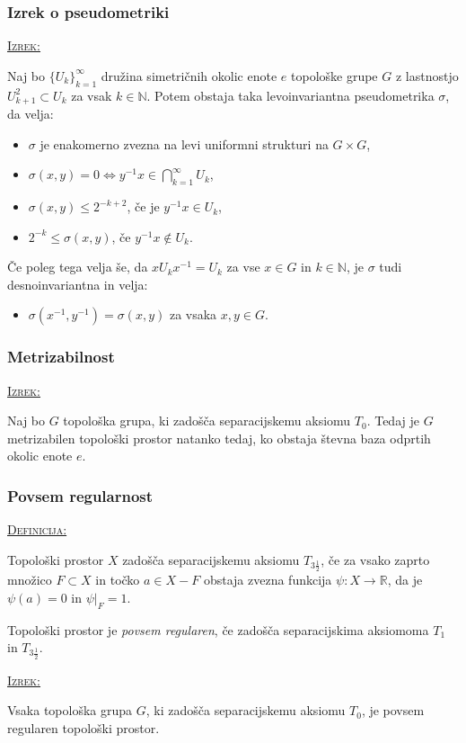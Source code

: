 \documentclass[a4paper, 12pt]{beamer}
\newenvironment{matematika}[1]{
\textcolor{bostonuniversityred}{\underline{\textsc{#1:}}}
}{
}
\begin{document}
\begin{frame}
\frametitle{Izrek o pseudometriki}
\begin{matematika}{Izrek}
	Naj bo $\{ U_k \}_{k=1}^{\infty}$ družina simetričnih okolic enote $e$ topološke grupe $G$ z lastnostjo $U_{k+1}^2 \subset U_k$ za vsak $k\in\mathbb{N}$. Potem obstaja taka levoinvariantna pseudometrika $\sigma$, da velja:
	\begin{itemize}[label=]
		\item $\sigma$ je enakomerno zvezna na levi uniformni strukturi na $G \times G$,
		\item $\sigma (x, y) = 0 \iff y^{-1}x \in \bigcap_{k=1}^{\infty}U_k$,
		\item $\sigma (x, y) \leq 2^{-k+2}$, če je $y^{-1}x \in U_k$,
		\item $2^{-k} \leq \sigma (x, y)$, če $y^{-1}x \notin U_k$.
	\end{itemize}
	Če poleg tega velja še, da $x U_k x^{-1} = U_k$ za vse $x \in G$ in $k\in\mathbb{N}$, je $\sigma$ tudi desnoinvariantna in velja:
	\begin{itemize}[label=]
		\item $\sigma (x^{-1}, y^{-1}) = \sigma (x, y)$ za vsaka $x, y \in G$.
	\end{itemize}
\end{matematika}
\end{frame}

\begin{frame}
\frametitle{Metrizabilnost}
\begin{matematika}{Izrek}
Naj bo $G$ topološka grupa, ki zadošča separacijskemu aksiomu $T_0$. Tedaj je $G$ metrizabilen topološki prostor natanko tedaj, ko obstaja števna baza odprtih okolic enote $e$.
\end{matematika}
\end{frame}

\begin{frame}
\frametitle{Povsem regularnost}
\begin{matematika}{Definicija}
Topološki prostor $X$ zadošča separacijskemu aksiomu $T_{3\frac{1}{2}}$, če za vsako zaprto množico $F \subset X$ in točko $a \in X-F$ obstaja zvezna funkcija $\psi: X \to \mathbb{R}$, da je $\psi(a) = 0$ in $\psi|_F = 1$.
\end{matematika}\newline

Topološki prostor je \emph{povsem regularen}, če zadošča separacijskima aksiomoma $T_1$ in $T_{3\frac{1}{2}}$. \newline

\begin{matematika}{Izrek}
Vsaka topološka grupa $G$, ki zadošča separacijskemu aksiomu $T_0$, je povsem regularen topološki prostor.
\end{matematika}
\end{frame}
\end{document}
